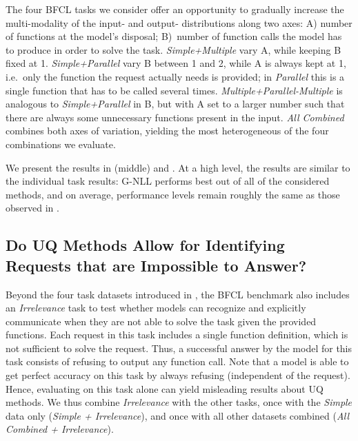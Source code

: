 The four BFCL tasks we consider offer an opportunity to gradually increase the multi-modality of the input- and output- distributions along two axes:
A) number of functions at the model's disposal;
B)~number of function calls the model has to produce in order to solve the task.
\textit{Simple+Multiple} vary A, while keeping B fixed at 1.
\textit{Simple+Parallel} vary B between 1 and 2, while A is always kept at 1, i.e.\ only the function the request actually needs is provided; in \emph{Parallel} this is a single function that has to be called several times.
\textit{Multiple+Parallel-Multiple} is analogous to \textit{Simple+Parallel} in B, but with A set to a larger number such that there are always some unnecessary functions present in the input.
\textit{All Combined} combines both axes of variation, yielding the most heterogeneous of the four combinations we evaluate.%


We present the results in  (middle) and .
At a high level, the results are similar to the individual task results: G-NLL performs best out of all of the considered methods, and on average, performance levels remain roughly the same as those observed in .








\subsection{Do UQ Methods Allow for Identifying Requests that are Impossible to Answer?}
\label{sec:irrelevance_combinations}

Beyond the four task datasets introduced in , the BFCL benchmark also includes an \emph{Irrelevance} task to test whether models can recognize and explicitly communicate when they are not able to solve the task given the provided functions. 
Each request in this task includes a single function definition, which is not sufficient to solve the request. 
Thus, a successful answer by the model for this task consists of refusing to output any function call. 
Note that a model is able to get perfect accuracy on this task by always refusing (independent of the request). 
Hence, evaluating on this task alone can yield misleading results about UQ methods. 
We thus combine \emph{Irrelevance} with the other tasks, once with the \emph{Simple} data only (\emph{Simple + Irrelevance}), and once with all other datasets combined (\emph{All Combined + Irrelevance}). %

